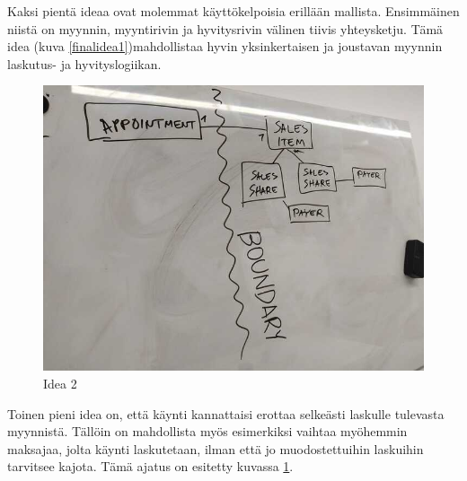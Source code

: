 Kaksi pientä ideaa ovat molemmat käyttökelpoisia erillään mallista.
Ensimmäinen niistä on myynnin, myyntirivin ja hyvitysrivin välinen
tiivis yhteysketju. Tämä idea (kuva \ref{finalidea1})mahdollistaa hyvin
yksinkertaisen ja joustavan myynnin laskutus- ja hyvityslogiikan.

\begin{figure}
\centering
\includegraphics{illustration/final-idea-2.jpg}
\caption{\label{finalidea2}Idea 2}
\end{figure}

Toinen pieni idea on, että käynti kannattaisi erottaa selkeästi laskulle
tulevasta myynnistä. Tällöin on mahdollista myös esimerkiksi vaihtaa
myöhemmin maksajaa, jolta käynti laskutetaan, ilman että jo
muodostettuihin laskuihin tarvitsee kajota. Tämä ajatus on esitetty
kuvassa \ref{finalidea2}.

